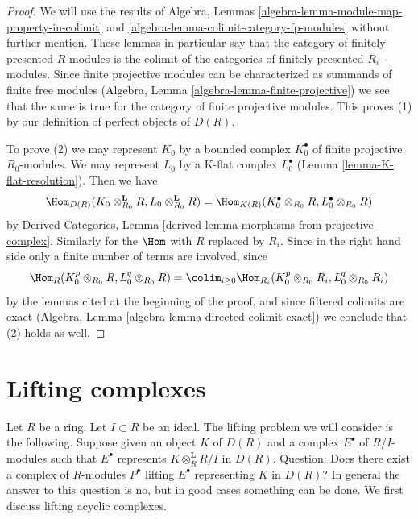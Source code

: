 \begin{proof}
We will use the results of
Algebra, Lemmas \ref{algebra-lemma-module-map-property-in-colimit} and
\ref{algebra-lemma-colimit-category-fp-modules}
without further mention. These lemmas in particular say that the
category of finitely presented $R$-modules is the colimit of the
categories of finitely presented $R_i$-modules. Since finite projective
modules can be characterized as summands of finite free modules
(Algebra, Lemma \ref{algebra-lemma-finite-projective}) we see that
the same is true for the category of finite projective modules.
This proves (1) by our definition of perfect objects of $D(R)$.

\medskip\noindent
To prove (2) we may represent $K_0$ by a bounded complex $K_0^\bullet$ of
finite projective $R_0$-modules. We may represent $L_0$ by a K-flat
complex $L_0^\bullet$ (Lemma \ref{lemma-K-flat-resolution}).
Then we have
$$
\Hom_{D(R)}(K_0 \otimes_{R_0}^\mathbf{L} R, L_0 \otimes_{R_0}^\mathbf{L} R) =
\Hom_{K(R)}(K_0^\bullet \otimes_{R_0} R, L_0^\bullet \otimes_{R_0} R)
$$
by Derived Categories, Lemma
\ref{derived-lemma-morphisms-from-projective-complex}.
Similarly for the $\Hom$ with $R$ replaced by $R_i$. Since
in the right hand side only a finite number of terms are involved,
since
$$
\Hom_R(K_0^p \otimes_{R_0} R, L_0^q \otimes_{R_0} R) =
\colim_{i \geq 0}
\Hom_{R_i}(K_0^p \otimes_{R_0} R_i, L_0^q \otimes_{R_0} R_i)
$$
by the lemmas cited at the beginning of the proof, and since
filtered colimits are exact
(Algebra, Lemma \ref{algebra-lemma-directed-colimit-exact})
we conclude that (2) holds as well.
\end{proof}






\section{Lifting complexes}
\label{section-lifting-complexes}

\noindent
Let $R$ be a ring. Let $I \subset R$ be an ideal. The lifting problem
we will consider is the following. Suppose given an object $K$ of $D(R)$
and a complex $E^\bullet$ of $R/I$-modules such that $E^\bullet$
represents $K \otimes_R^\mathbf{L} R/I$ in $D(R)$.
Question: Does there exist a complex of $R$-modules $P^\bullet$
lifting $E^\bullet$ representing $K$ in $D(R)$?
In general the answer to this question is no, but in good
cases something can be done. We first discuss lifting acyclic complexes.

